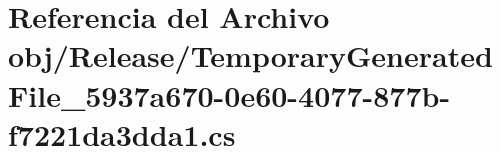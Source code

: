 \hypertarget{Release_2TemporaryGeneratedFile__5937a670-0e60-4077-877b-f7221da3dda1_8cs}{}\section{Referencia del Archivo obj/\+Release/\+Temporary\+Generated\+File\+\_\+5937a670-\/0e60-\/4077-\/877b-\/f7221da3dda1.cs}
\label{Release_2TemporaryGeneratedFile__5937a670-0e60-4077-877b-f7221da3dda1_8cs}
